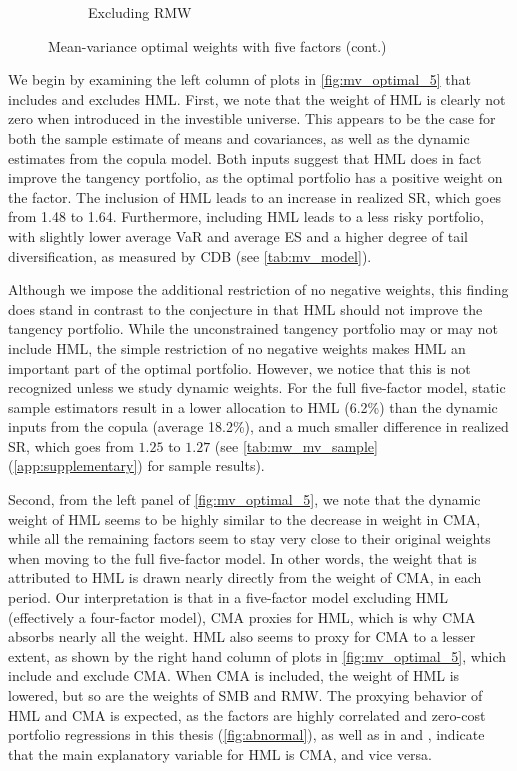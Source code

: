 \begin{figure}[p]
\begin{subfigure}{0.45\textwidth}
    \caption{Excluding RMW}
  \end{subfigure}  
  \footnotesize
  \caption{Mean-variance optimal weights with five factors (cont.)}
\end{figure}

We begin by examining the left column of plots in \autoref{fig:mv_optimal_5} that includes and excludes HML. First, we note that the weight of HML is clearly not zero when introduced in the investible universe. This appears to be the case for both the sample estimate of means and covariances, as well as the dynamic estimates from the copula model. Both inputs suggest that HML does in fact improve the tangency portfolio, as the optimal portfolio has a positive weight on the factor. The inclusion of HML leads to an increase in realized SR, which goes from 1.48 to 1.64. Furthermore, including HML leads to a less risky portfolio, with slightly lower average VaR and average ES and a higher degree of tail diversification, as measured by CDB (see \autoref{tab:mv_model}).

Although we impose the additional restriction of no negative weights, this finding does stand in contrast to the conjecture in \textcite{FF2015} that HML should not improve the tangency portfolio. While the unconstrained tangency portfolio may or may not include HML, the simple restriction of no negative weights makes HML an important part of the optimal portfolio. However, we notice that this is not recognized unless we study dynamic weights. For the full five-factor model, static sample estimators result in a lower allocation to HML (6.2\%) than the dynamic inputs from the copula (average 18.2\%), and a much smaller difference in realized SR, which goes from $1.25$ to $1.27$ (see \autoref{tab:mw_mv_sample} (\autoref{app:supplementary}) for sample results).

Second, from the left panel of \autoref{fig:mv_optimal_5}, we note that the dynamic weight of HML seems to be highly similar to the decrease in weight in CMA, while all the remaining factors seem to stay very close to their original weights when moving to the full five-factor model. In other words, the weight that is attributed to HML is drawn nearly directly from the weight of CMA, in each period. Our interpretation is that in a five-factor model excluding HML (effectively a four-factor model), CMA proxies for HML, which is why CMA absorbs nearly all the weight. HML also seems to proxy for CMA to a lesser extent, as shown by the right hand column of plots in \autoref{fig:mv_optimal_5}, which include and exclude CMA. When CMA is included, the weight of HML is lowered, but so are the weights of SMB and RMW. The proxying behavior of HML and CMA is expected, as the factors are highly correlated and zero-cost portfolio regressions in this thesis (\autoref{fig:abnormal}), as well as in \textcite{FF2015} and \textcite{Asness2015}, indicate that the main explanatory variable for HML is CMA, and vice versa.

